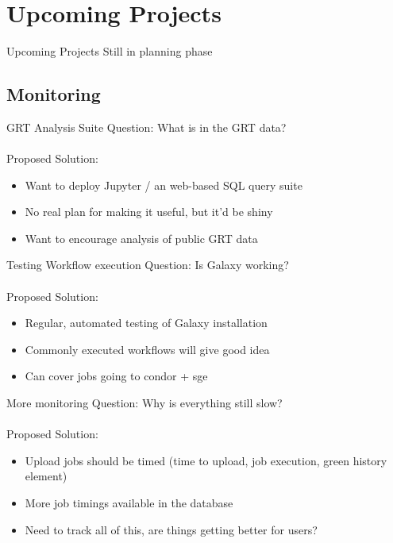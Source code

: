 \documentclass[12pt]{ufrslides}
\begin{document}
\section[Upcoming]{Upcoming Projects}
\begin{frame}{Upcoming Projects}
	Still in planning phase
\end{frame}

\subsection{Monitoring}

	\begin{frame}{GRT Analysis Suite}
		Question: What is in the GRT data? \\ \ \\
		Proposed Solution:
		\begin{itemize}
			\item Want to deploy Jupyter / an web-based SQL query suite
			\item No real plan for making it useful, but it'd be shiny
			\item Want to encourage analysis of public GRT data
		\end{itemize}
	\end{frame}

	\begin{frame}{Testing Workflow execution}
		Question: Is Galaxy working? \\ \ \\
		Proposed Solution:
		\begin{itemize}
			\item Regular, automated testing of Galaxy installation
			\item Commonly executed workflows will give good idea
			\item Can cover jobs going to condor + sge
		\end{itemize}
	\end{frame}

	\begin{frame}{More monitoring}
		Question: Why is everything still slow? \\ \ \\
		Proposed Solution:
		\begin{itemize}
			\item Upload jobs should be timed (time to upload, job execution, green history element)
			\item More job timings available in the database
			\item Need to track all of this, are things getting better for users?
		\end{itemize}
	\end{frame}
\end{document}
